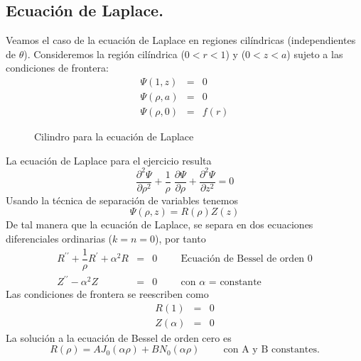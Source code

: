 \subsection{Ecuación de Laplace.}
Veamos el caso de la ecuación de Laplace en regiones cilíndricas (independientes de $\theta$). Consideremos la región cilíndrica ($0 < r < 1$) y ($0 < z < a$) sujeto a las condiciones de frontera:
\begin{eqnarray*}
\Psi(1,z) &=& 0 \nonumber \\
\Psi(\rho, a) &=& 0 \nonumber \\
\Psi(\rho, 0) &=& f(r)
\end{eqnarray*}
\begin{figure}[H]
\centering

\label{fig:cilindro_Laplace}
\caption{Cilindro para la ecuación de Laplace}
\end{figure}
La ecuación de Laplace para el ejercicio resulta
\begin{equation}
\dfrac{\partial^{2} \Psi}{\partial \rho^{2}} + \dfrac{1}{\rho} \; \dfrac{\partial \Psi}{\partial \rho} + \dfrac{\partial^{2} \Psi}{\partial z^{2}} = 0
\label{eq:ecuacion_05_86}
\end{equation}
Usando la técnica de separación de variables tenemos
\begin{equation}
\Psi (\rho, z) = R(\rho) Z(z)
\label{eq:ecuacion_05_87}
\end{equation}
De tal manera que la ecuación de Laplace, se separa en dos ecuaciones diferenciales ordinarias ($k=n=0$), por tanto
\begin{eqnarray}
R^{\prime \prime} + \dfrac{1}{\rho} R^{\prime} + \alpha^{2} R &=& 0 \hspace{1cm} \mbox{Ecuación de Bessel de orden 0} \label{eq:ecuacion_05_88}  \\
Z^{\prime \prime} - \alpha^{2} Z &=& 0 \hspace{1cm} \mbox{con $\alpha$ = constante} \label{eq:ecuacion_05_89}
\end{eqnarray}
Las condiciones de frontera se reescriben como
\begin{equation}
\begin{aligned}
R(1) &=& 0 \\
Z(\alpha) &=& 0 
\end{aligned}
\label{eq:ecuacion_05_90}
\end{equation}
La solución a la ecuación de Bessel de orden cero es
\begin{equation}
R(\rho) = A J_{0} (\alpha \rho) + B N_{0} (\alpha \rho) \hspace{1cm} \mbox{con A y B constantes.}
\label{eq:ecuacion_05_91}
\end{equation}
